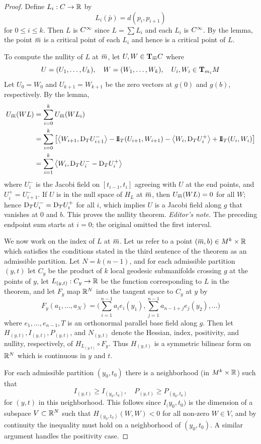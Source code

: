 \documentclass[../main]{subfiles}
\begin{document}
\begin{proof}
Define $L_i:C\functionMaps\bR$ by
\[L_i(\bar p) = d(p_i,p_{i+1})\]
for $0\le i\le k$. Then $L$ is $\CInfty$ since  $L=\sum L_i$ and each $L_i$ is $\CInfty$. By the lemma, the point $\xoverline m$ is a critical point of each $L_i$ and hence is a critical point of $L$.

To compute the nullity of $L$ at $\xoverline m$, let $U,W\in\ts{C}{\xoverline m}$ where \[U=(U_1,\ldots,U_k),
\quad W=(W_1,\ldots,W_k),
\quad U_i,W_i\in\ts{M}{m_i}\]
Let $U_0=W_0$ and $U_{k+1}=W_{k+1}$ be the zero vectors at $g(0)$ and $g(b)$, respectively. By the lemma,
\begin{align*}
    U_{\xoverline m}(WL) &= \sum_{i=0}^k U_{\xoverline m}(WL_i) \\
    &= \sum_{i=0}^k\sbr{\ip{W_{i+1}}{\D_TU_{i+1}^-} - \secondForm_T(U_{i+1},W_{i+1}) - \ip{W_i}{\D_TU_i^+} + \secondForm_T(U_i,W_i)} \\
    &=\sum_{i=1}^k\ip{W_i}{\D_TU_i^- - \D_TU_i^+}
\end{align*}
where $U_i^-$ is the Jacobi field on $[t_{i-1},t_i]$ agreeing with $U$ at the end points, and $U_i^+=U_{i+1}^-$. If $U$ is in the null space of $H_L$ at $\xoverline m$, then $U_{\xoverline m}(WL)=0$ for all $W$; hence $\D_TU_i^-=\D_TU_i^+$ for all $i$, which implies $U$ is a Jacobi field along $g$ that vanishes at 0 and $b$. This proves the nullity theorem.
\noindent\emph{Editor's note.} The preceding endpoint sum starts at $i=0$; the original omitted the first interval.

We now work on the index of $L$ at $\xoverline m$. Let us refer to a point $(\xoverline m,b)\in M^k\times\bR$ which satisfies the conditions stated in the third sentence of the theorem as an admissible partition. Let $N=k(n-1)$, and for each admissible partition $(y,t)$ let $C_y$ be the product of $k$ local geodesic submanifolds crossing $g$ at the points of $y$, let $L_{(y,t)}:C_y\functionMaps\bR$ be the function corresponding to $L$ in the theorem, and let $F_y$ map $\bR^N$ into the tangent space to $C_y$ at $y$ by
\[F_y(a_1,\ldots,a_N) = \bigg(\sum_{i=1}^{n-1}a_ie_i(y_1),\sum_{j=1}^{n-1}a_{n-1+j}e_j(y_2),\ldots\bigg)\]
where $e_1,\ldots,e_{n-1},T$ is an orthonormal parallel base field along $g$. Then let $H_{(y,t)},I_{(y,t)},P_{(y,t)}$, and $N_{(y,t)}$ denote the Hessian, index, positivity, and nullity, respectively, of $H_{L_{(y,t)}}\circ F_y$. Thus $H_{(y,t)}$ is a symmetric bilinear form on $\bR^N$ which is continuous in $y$ and $t$.

For each admissible partition $(y_0,t_0)$ there is a neighborhood (in $M^k\times\bR$) such that
\begin{equation} \tag{11}\label{eqn:ch10.4.2}
I_{(y,t)} \ge I_{(y_0,t_0)},
\quad P_{(y,t)} \ge P_{(y_0,t_0)}
\end{equation}
for $(y,t)$ in this neighborhood. This follows since $I_({y_0,t_0)}$ is the dimension of a subspace $V\subset\bR^N$ such that $H_{(y_0,t_0)}(W,W)<0$ for all non-zero $W\in V$, and by continuity the inequality must hold on a neighborhood of $(y_0,t_0)$. A similar argument handles the positivity case.


\end{proof}
\end{document}
